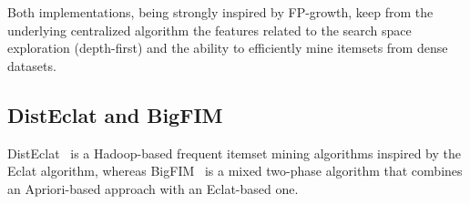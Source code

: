 Both implementations, being strongly inspired by FP-growth, keep from the
underlying centralized algorithm the features related to the search space exploration
(depth-first) and the ability to efficiently mine itemsets from dense datasets.


\subsection{DistEclat and BigFIM}
\label{bigfim}
DistEclat~\cite{bigfim} is a Hadoop-based frequent itemset mining algorithms inspired 
by the Eclat algorithm, whereas BigFIM~\cite{bigfim} is a mixed two-phase algorithm that combines an Apriori-based approach with 
an Eclat-based one.

%

%

